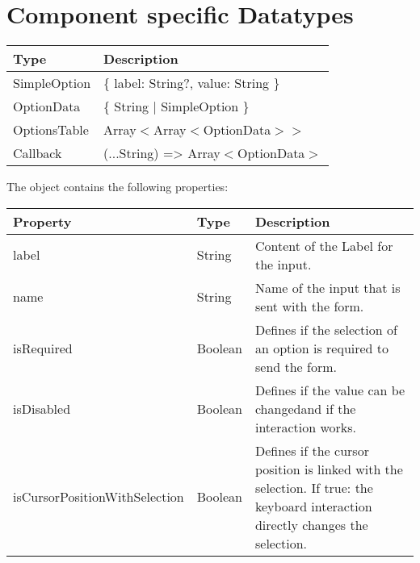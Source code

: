 \section*{Component specific Datatypes}

\begin{table}[!htb] 
    \label{api:selectComponentTypes}
    \footnotesize
    \setlength\extrarowheight{4pt}
    \begin{tabular}{ p{5cm} p{7.5cm}}
        \toprule[1.2pt]
        \textbf{Type}    & \textbf{Description} \\
        \midrule    
        SimpleOption & \{ label: String?, value: String \}    \\
        OptionData   & \{ String | SimpleOption \}            \\
        OptionsTable & Array$<$Array$<$OptionData$>>$         \\
        Callback     & (...String) => Array$<$OptionData$>$   \\
        \bottomrule[1.2pt]
    \end{tabular}
\end{table}

\vspace*{12pt}
The  object contains the following properties: 

\begin{table}[!htb] 
    \label{api:selectComponentSelectAttributes}
    \footnotesize
    \setlength\extrarowheight{4pt}
    \begin{tabular}{ p{4cm} p{2.5cm} p{6cm} }
        \toprule[1.2pt]
        \textbf{Property}             & \textbf{Type} & \textbf{Description} \\
        \midrule
        label                         & String        & Content of the Label for the input. \\
        name                          & String        & Name of the input that is sent with the form. \\
        isRequired                    & Boolean       & Defines if the selection of an option is required to send the form. \\
        isDisabled                    & Boolean       & Defines if the value can be changedand if the interaction works. \\
        isCursorPositionWithSelection & Boolean       & Defines if the cursor position is linked with the selection. 
                                                        If true: the keyboard interaction directly changes the selection. \\
        \bottomrule[1.2pt]
    \end{tabular}
\end{table}



